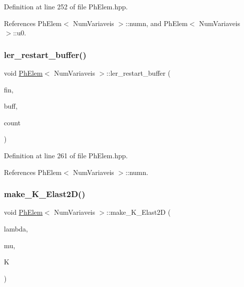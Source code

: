 Definition at line 252 of file Ph\+Elem.\+hpp.



References Ph\+Elem$<$ Num\+Variaveis $>$\+::numn, and Ph\+Elem$<$ Num\+Variaveis $>$\+::u0.

\mbox{\label{classPhElem_ad0a2992e6d206b6a351da8847a9dd69a}} 
\subsubsection{\texorpdfstring{ler\+\_\+restart\+\_\+buffer()}{ler\_restart\_buffer()}}
{\footnotesize\ttfamily void \hyperlink{classPhElem}{Ph\+Elem}$<$ Num\+Variaveis $>$\+::ler\+\_\+restart\+\_\+buffer (\begin{DoxyParamCaption}\item[{F\+I\+LE $\ast$}]{fin,  }\item[{double $\ast$}]{buff,  }\item[{int \&}]{count }\end{DoxyParamCaption})\hspace{0.3cm}{\ttfamily [inherited]}}



Definition at line 261 of file Ph\+Elem.\+hpp.



References Ph\+Elem$<$ Num\+Variaveis $>$\+::numn.

\mbox{\label{classPhElem_ac59f1cbe0962524e3aa5eced9a4393f6}} 
\subsubsection{\texorpdfstring{make\+\_\+\+K\+\_\+\+Elast2\+D()}{make\_K\_Elast2D()}}
{\footnotesize\ttfamily void \hyperlink{classPhElem}{Ph\+Elem}$<$ Num\+Variaveis $>$\+::make\+\_\+\+K\+\_\+\+Elast2D (\begin{DoxyParamCaption}\item[{const double}]{lambda,  }\item[{const double}]{mu,  }\item[{double $\ast$$\ast$}]{K }\end{DoxyParamCaption})\hspace{0.3cm}{\ttfamily [inherited]}}



